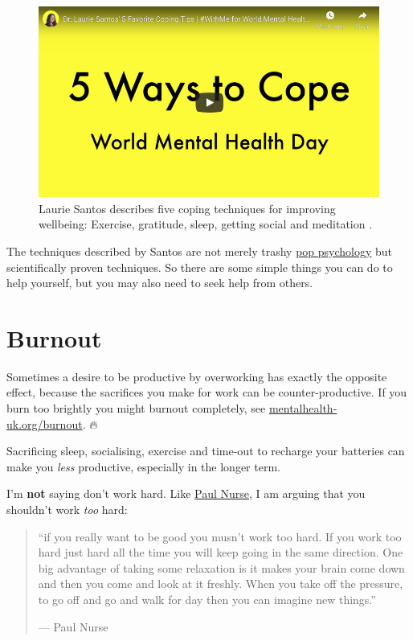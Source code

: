 \documentclass[
]{book}
\begin{document}
\begin{figure}

{\centering \includegraphics[width=0.99\linewidth]{images/youtube-santos} 

}

\caption{Laurie Santos describes five coping techniques for improving wellbeing: Exercise, gratitude, sleep, getting social and meditation \citep{youtube-santos}.}\label{fig:laurie-fig}
\end{figure}



The techniques described by Santos are not merely trashy \href{https://en.wikipedia.org/wiki/Popular_psychology}{pop psychology} but scientifically proven techniques. \citep{yaden} So there are some simple things you can do to help yourself, but you may also need to seek help from others.

\hypertarget{burnout}{%
\section{Burnout}\label{burnout}}

Sometimes a desire to be productive by overworking has exactly the opposite effect, because the sacrifices you make for work can be counter-productive. If you burn too brightly you might burnout completely, see \href{https://mentalhealth-uk.org/burnout/}{mentalhealth-uk.org/burnout}. 🔥

Sacrificing sleep, socialising, exercise and time-out to recharge your batteries can make you \emph{less} productive, especially in the longer term.

I'm \textbf{not} saying don't work hard. Like \href{https://en.wikipedia.org/wiki/Paul_Nurse}{Paul Nurse}, I am arguing that you shouldn't work \emph{too} hard:

\begin{quote}
``if you really want to be good you musn't work too hard. If you work too hard just hard all the
time you will keep going in the same direction. One big advantage of taking some relaxation is it
makes your brain come down and then you come and look at it freshly. When you take off the
pressure, to go off and go and walk for day then you can imagine new things.''

\hfill --- Paul Nurse \citep{paulnurse}
\end{quote}
\end{document}

